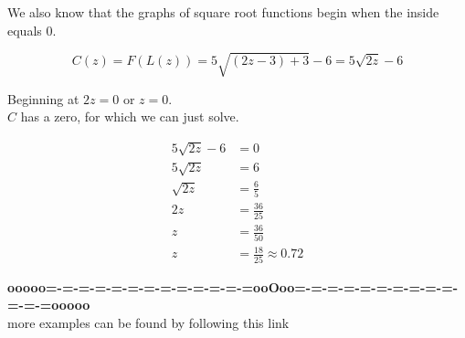 \documentclass{ximera}
\begin{document}
\begin{example}
\begin{image}
\end{image}





We also know that the graphs of square root functions begin when the inside equals $0$. 

\[
C(z) = F(L(z)) = 5 \sqrt{(2z - 3) + 3} - 6 = 5 \sqrt{2z} - 6
\]


Beginning at $2z = 0$ or $z = 0$. \\

$C$ has a zero, for which we can just solve.




\begin{align*}
5 \sqrt{2z} - 6 &= 0 \\
5 \sqrt{2z}     &= 6 \\
\sqrt{2z}       &= \frac{6}{5} \\
2z            &= \frac{36}{25}  \\
z                  &= \frac{36}{50} \\
z                 &= \frac{18}{25} \approx 0.72
\end{align*}




\end{example}




















\begin{center}
\textbf{\textcolor{green!50!black}{ooooo=-=-=-=-=-=-=-=-=-=-=-=-=ooOoo=-=-=-=-=-=-=-=-=-=-=-=-=ooooo}} \\

more examples can be found by following this link\\ 

\end{center}
\end{document}
